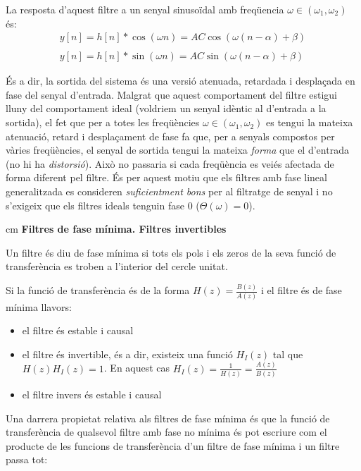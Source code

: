\documentclass{article}
\begin{document}
La resposta d'aquest filtre a un senyal sinusoïdal amb freqüencia $\omega \in (\omega_1, \omega_2)$ és:
\begin{equation}
\begin{array}{l}
y[n]=h[n] * \cos(\omega n)=A C \cos(\omega (n - \alpha) + \beta) \\ \\
y[n]=h[n] * \sin(\omega n)=A C \sin(\omega (n - \alpha)+ \beta)
\end{array} 
\end{equation}

És a dir, la sortida del sistema és una versió atenuada, retardada i desplaçada en fase del senyal d'entrada.
Malgrat que aquest comportament del filtre estigui lluny del comportament ideal (voldriem un senyal idèntic
al d'entrada a la sortida), el fet que per a totes les freqüències $\omega \in (\omega_1, \omega_2)$ es tengui
la mateixa atenuació, retard i desplaçament de fase fa que, per a senyals compostos per vàries freqüències,
el senyal de sortida tengui la mateixa \textit{forma} que el d'entrada (no hi ha \textit{distorsió}). 
Això no passaria si cada freqüència
es veiés afectada de forma diferent pel filtre. És per aquest motiu que els filtres amb fase lineal generalitzada
es consideren \textit{suficientment bons} per al filtratge de senyal i no s'exigeix que els filtres ideals
tenguin fase $0$ ($\Theta(\omega)=0$).


 cm
\noindent
\textbf{Filtres de fase mínima. Filtres invertibles}

Un filtre és diu de fase mínima si tots els pols i els zeros de la seva funció de transferència
es troben a l'interior del cercle unitat. 

Si la funció de transferència és de la forma $H(z)=\frac{B(z)}{A(z)}$ i el filtre és
de fase mínima llavors:
\begin{itemize}
\item el filtre és estable i causal
\item el filtre és invertible, és a dir, existeix una funció $H_I(z)$ tal que $H(z) H_I(z)=1$.
En aquest cas $H_I(z)=\frac{1}{H(z)}=\frac{A(z)}{B(z)}$
\item el filtre invers és estable i causal
\end{itemize}

Una darrera propietat relativa als filtres de fase mínima és que la funció de transferència de
qualsevol filtre amb fase no mínima és pot escriure com el producte de les funcions de
transferència d'un filtre de fase mínima i un filtre passa tot:
\end{document}
